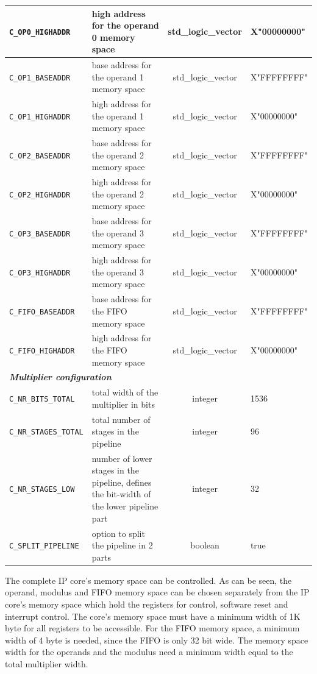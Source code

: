 \begin{center}
\begin{tabular}{|l|p{6.5cm}|c|l|}
		\hline
		\verb|C_OP0_HIGHADDR| & high address for the operand 0 memory space & std\_logic\_vector & X"00000000" \bigstrut\\
		\hline
		\verb|C_OP1_BASEADDR| & base address for the operand 1 memory space & std\_logic\_vector & X"FFFFFFFF" \bigstrut\\
		\hline
		\verb|C_OP1_HIGHADDR| & high address for the operand 1 memory space & std\_logic\_vector & X"00000000" \bigstrut\\
		\hline
		\verb|C_OP2_BASEADDR| & base address for the operand 2 memory space & std\_logic\_vector & X"FFFFFFFF" \bigstrut\\
		\hline
		\verb|C_OP2_HIGHADDR| & high address for the operand 2 memory space & std\_logic\_vector & X"00000000" \bigstrut\\
		\hline
		\verb|C_OP3_BASEADDR| & base address for the operand 3 memory space & std\_logic\_vector & X"FFFFFFFF" \bigstrut\\
		\hline
		\verb|C_OP3_HIGHADDR| & high address for the operand 3 memory space & std\_logic\_vector & X"00000000" \bigstrut\\
		\hline
		\verb|C_FIFO_BASEADDR| & base address for the FIFO memory space & std\_logic\_vector & X"FFFFFFFF" \bigstrut\\
		\hline
		\verb|C_FIFO_HIGHADDR| & high address for the FIFO memory space & std\_logic\_vector & X"00000000" \bigstrut\\
		\hline
		\multicolumn{4}{|l|}{\textit{\textbf{Multiplier configuration}}} \\
		\hline
		\verb|C_NR_BITS_TOTAL| & total width of the multiplier in bits & integer & 1536\bigstrut\\
		\hline
		\verb|C_NR_STAGES_TOTAL| & total number of stages in the pipeline & integer & 96\bigstrut\\
		\hline
		\verb|C_NR_STAGES_LOW| & number of lower stages in the pipeline, defines the bit-width of the lower pipeline part & integer & 32 \bigstrut\\
		\hline
		\verb|C_SPLIT_PIPELINE| & option to split the pipeline in 2 parts & boolean & true \bigstrut\\
		\hline
	\end{tabular}%
\end{center}

The complete IP core's memory space can be controlled. As can be seen, the operand, modulus and FIFO memory space can be
chosen separately from the IP core's memory space which hold the registers for control, software reset and interrupt
control. The core's memory space must have a minimum width of 1K byte for all registers to be accessible. For the FIFO
memory space, a minimum width of 4 byte is needed, since the FIFO is only 32 bit wide. The memory space width for the
operands and the modulus need a minimum width equal to the total multiplier width.\\

